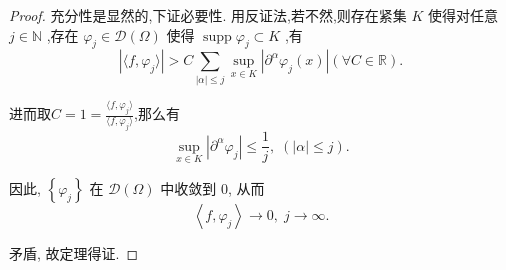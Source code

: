 \documentclass[lang=cn,newtx,10pt,scheme=chinese,thmcnt=chapter]{elegantbook}
\begin{document}
\begin{proof}
  充分性是显然的,下证必要性. 用反证法,若不然,则存在紧集 \(K\) 使得对任意 \(j \in  \mathbb{N}\) ,存在 \({\varphi }_{j} \in  \mathcal{D}\left( \Omega \right)\) 使得 \(\operatorname{supp}{\varphi }_{j} \subset  K\) ,有
\begin{equation*}
\left| {\langle f,\varphi_j \rangle }\right|  >  C\mathop{\sum }\limits_{{\left| \alpha \right|  \leqslant  j}}\mathop{\sup }\limits_{{x \in  K}}\left| {{\partial }^{\alpha }\varphi_j \left( x\right) }\right| (\forall C\in \mathbb{R}). 
\end{equation*}
  
  进而取$C=1=\frac{\langle f,\varphi_j \rangle}{\langle f,\varphi_j \rangle}$,那么有
\begin{equation*}
\mathop{\sup }\limits_{{x \in  K}}\left| {{\partial }^{\alpha }{\varphi }_{j}}\right|  \leqslant  \frac{1}{j},\;\left( {\left| \alpha \right|  \leqslant  j}\right) .
\end{equation*}

因此, \(\left\{  {\varphi }_{j}\right\}\) 在 \(\mathcal{D}\left( \Omega \right)\) 中收敛到 0, 从而
\begin{equation*}
\left\langle  {f,{\varphi }_{j}}\right\rangle   \rightarrow  0,\;j \rightarrow  \infty .
\end{equation*}

矛盾, 故定理得证.
\end{proof}
\end{document}
